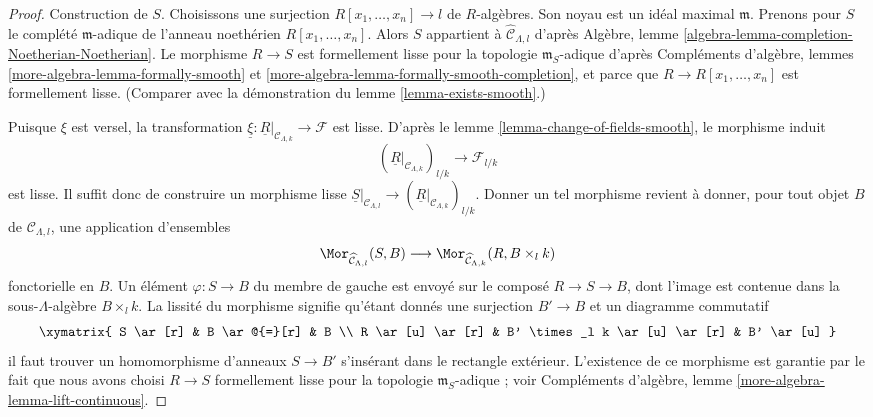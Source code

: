 \begin{proof}
Construction de $S$. Choisissons une surjection
$R[x_1, \ldots, x_n] \to l$ de $R$-algèbres. Son noyau est un idéal maximal
$\mathfrak m$.
Prenons pour $S$ le complété $\mathfrak m$-adique de l'anneau noethérien
$R[x_1, \ldots, x_n]$. Alors $S$ appartient à
$\widehat{\mathcal{C}}_{\Lambda, l}$ d'après Algèbre, lemme
\ref{algebra-lemma-completion-Noetherian-Noetherian}. Le morphisme $R \to S$
est formellement lisse pour la topologie $\mathfrak m_S$-adique d'après
Compléments d'algèbre, lemmes \ref{more-algebra-lemma-formally-smooth} et
\ref{more-algebra-lemma-formally-smooth-completion}, et parce que
$R \to R[x_1, \ldots, x_n]$ est formellement lisse. (Comparer avec la
démonstration du lemme \ref{lemma-exists-smooth}.)

\medskip\noindent
Puisque $\xi$ est versel, la transformation
$\underline{\xi} : \underline{R}|_{\mathcal{C}_{\Lambda, k}} \to \mathcal{F}$
est lisse. D'après le lemme \ref{lemma-change-of-fields-smooth}, le morphisme
induit
$$
(\underline{R}|_{\mathcal{C}_{\Lambda, k}})_{l/k}
\longrightarrow
\mathcal{F}_{l/k}
$$
est lisse. Il suffit donc de construire un morphisme lisse
$\underline{S}|_{\mathcal{C}_{\Lambda, l}} \to
(\underline{R}|_{\mathcal{C}_{\Lambda, k}})_{l/k}$. Donner un tel morphisme
revient à donner, pour tout objet $B$ de $\mathcal{C}_{\Lambda, l}$, une
application d'ensembles
$$
\Mor_{\widehat{\mathcal{C}}_{\Lambda, l}}(S, B)
\longrightarrow
\Mor_{\widehat{\mathcal{C}}_{\Lambda, k}}(R, B \times_l k)
$$
fonctorielle en $B$. Un élément $\varphi : S \to B$ du membre de gauche est
envoyé sur le composé $R \to S \to B$, dont l'image est contenue dans la
sous-$\Lambda$-algèbre $B \times_l k$. La lissité du morphisme signifie
qu'étant donnés une surjection $B' \to B$ et un diagramme commutatif
$$
\xymatrix{
S \ar[r] & B \ar@{=}[r] & B \\
R \ar[u] \ar[r] & B' \times_l k \ar[u] \ar[r] & B' \ar[u]
}
$$
il faut trouver un homomorphisme d'anneaux $S \to B'$ s'insérant dans le
rectangle extérieur. L'existence de ce morphisme est garantie par le fait que
nous avons choisi $R \to S$ formellement lisse pour la topologie $\mathfrak m_S$-adique ; voir
Compléments d'algèbre, lemme \ref{more-algebra-lemma-lift-continuous}.
\end{proof}



























